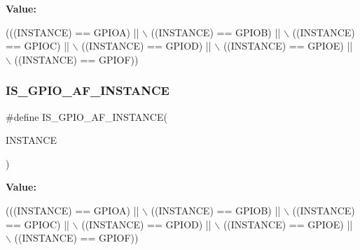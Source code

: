 {\bfseries Value\+:}
\begin{DoxyCode}
(((INSTANCE) == GPIOA) || \(\backslash\)
                                         ((INSTANCE) == GPIOB) || \(\backslash\)
                                         ((INSTANCE) == GPIOC) || \(\backslash\)
                                         ((INSTANCE) == GPIOD) || \(\backslash\)
                                         ((INSTANCE) == GPIOE) || \(\backslash\)
                                         ((INSTANCE) == GPIOF))
\end{DoxyCode}
\mbox{\label{group___exported__macro_ga9d2e0c4bb80b983730a3a5d98d56f535}} 
\subsubsection{\texorpdfstring{I\+S\+\_\+\+G\+P\+I\+O\+\_\+\+A\+F\+\_\+\+I\+N\+S\+T\+A\+N\+CE}{IS\_GPIO\_AF\_INSTANCE}\hspace{0.1cm}{\footnotesize\ttfamily [16/16]}}
{\footnotesize\ttfamily \#define I\+S\+\_\+\+G\+P\+I\+O\+\_\+\+A\+F\+\_\+\+I\+N\+S\+T\+A\+N\+CE(\begin{DoxyParamCaption}\item[{}]{I\+N\+S\+T\+A\+N\+CE }\end{DoxyParamCaption})}

{\bfseries Value\+:}
\begin{DoxyCode}
(((INSTANCE) == GPIOA) || \(\backslash\)
                                         ((INSTANCE) == GPIOB) || \(\backslash\)
                                         ((INSTANCE) == GPIOC) || \(\backslash\)
                                         ((INSTANCE) == GPIOD) || \(\backslash\)
                                         ((INSTANCE) == GPIOE) || \(\backslash\)
                                         ((INSTANCE) == GPIOF))
\end{DoxyCode}
\mbox{\label{group___exported__macro_ga783626dd2431afebea836a102e318957}} 

